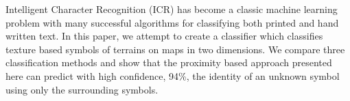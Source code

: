 
Intelligent Character Recognition (ICR) has become a classic machine learning
problem with many successful algorithms for classifying both printed and hand
written text. In this paper, we attempt to create a classifier which classifies
texture based symbols of terrains on maps in two dimensions. We compare three
classification methods and show that the proximity based approach presented
here can predict with high confidence, 94\%, the identity of an unknown symbol
using only the surrounding symbols.

